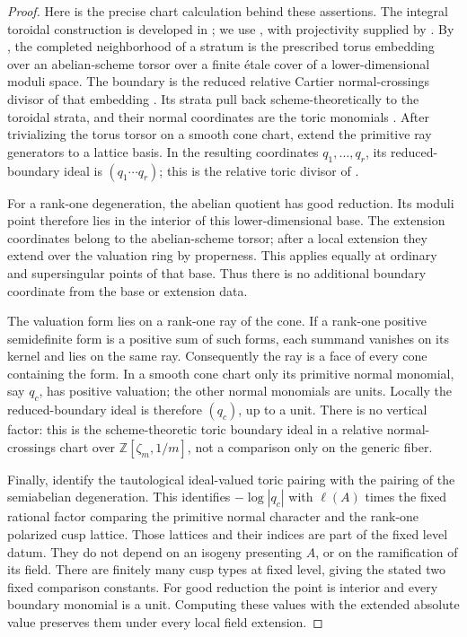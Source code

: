 \documentclass[11pt,a4paper]{article}
\numberwithin{equation}{section}
\theoremstyle{definition}
\theoremstyle{remark}
\newcommand{\Z}{\mathbb Z}
\begin{document}
\begin{proof}
Here is the precise chart calculation behind these assertions.
The integral toroidal construction is developed in \cite{FC}; we use
\cite[Construction~6.3.1.1 and Theorem~6.4.1.1]{Lan}, with projectivity
supplied by \cite[Theorem~7.3.3.4]{Lan}.
By \cite[Theorem~6.4.1.1(2), (5)]{Lan}, the completed neighborhood of
a stratum is the prescribed torus embedding over an abelian-scheme
torsor over a finite \'etale cover of a lower-dimensional moduli
space. The boundary is the reduced relative Cartier normal-crossings
divisor of that embedding \cite[Theorem~6.4.1.1(3)]{Lan}.
Its strata pull back scheme-theoretically to the toroidal strata,
and their normal coordinates are the toric monomials
\cite[Proposition~6.3.1.6(1)]{Lan}.
After trivializing the torus torsor on a smooth cone chart, extend
the primitive ray generators to a lattice basis. In the resulting
coordinates \(q_1,\ldots,q_r\), its reduced-boundary ideal is
\((q_1\cdots q_r)\); this is the relative toric divisor of
\cite[Theorem~6.1.2.8(5)]{Lan}.

For a rank-one degeneration, the abelian quotient has good reduction.
Its moduli point therefore lies in the interior of this lower-dimensional
base. The extension coordinates belong to the abelian-scheme torsor;
after a local extension they extend over the valuation ring by
properness. This applies equally at ordinary and supersingular points
of that base. Thus there is no additional boundary coordinate from
the base or extension data.

The valuation form lies on a rank-one ray of the cone. If a rank-one
positive semidefinite form is a positive sum of such forms, each
summand vanishes on its kernel and lies on the same ray. Consequently
the ray is a face of every cone containing the form. In a smooth
cone chart only its primitive normal monomial, say \(q_c\), has
positive valuation; the other normal monomials are units. Locally
the reduced-boundary ideal is therefore \((q_c)\), up to a unit.
There is no vertical factor: this is the scheme-theoretic toric
boundary ideal in a relative normal-crossings chart over
\(\Z[\zeta_m,1/m]\), not a comparison only on the generic fiber.

Finally, \cite[Propositions~6.2.5.8(3), 6.2.5.11, and~6.3.1.6(4)]{Lan}
identify the tautological
ideal-valued toric pairing with the pairing of the semiabelian
degeneration. This identifies \(-\log|q_c|\) with \(\ell(A)\) times
the fixed rational factor comparing the primitive normal character
and the rank-one polarized cusp lattice. Those lattices and their
indices are part of the fixed level datum. They do not depend on
an isogeny presenting \(A\), or on the ramification of its field.
There are finitely many cusp types at fixed level, giving the stated
two fixed comparison constants. For good reduction the point is
interior and every boundary monomial is a unit. Computing these
values with the extended absolute value preserves them under every
local field extension.


\end{proof}
\end{document}

